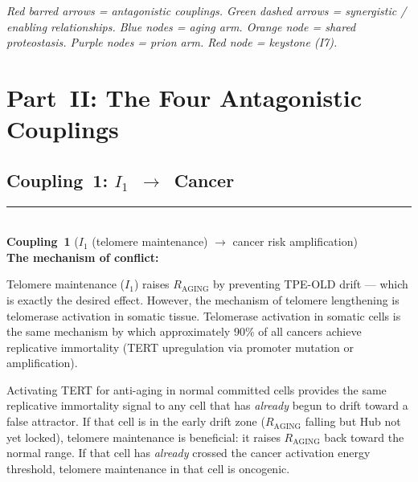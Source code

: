\documentclass[12pt,a4paper]{article}
\newcommand{\raging}{$R_{\mathrm{AGING}}$}
\newcommand{\tpeold}{TPE-OLD}
\newcommand{\Inet}[1]{$I_{#1}$}
\newcommand{\coupling}[2]{\medskip\noindent\rule{\linewidth}{0.4pt}\\
  \textbf{Coupling~#1} (#2)\\[0.3em]}
\begin{document}
\begin{center}
\end{center}

\vspace{0.5em}
\noindent\textit{Red barred arrows = antagonistic couplings. Green dashed
arrows = synergistic / enabling relationships. Blue nodes = aging arm.
Orange node = shared proteostasis. Purple nodes = prion arm.
Red node = keystone (I7).}

\section{Part~II: The Four Antagonistic Couplings}

\subsection{Coupling~1: \texorpdfstring{\Inet{1}~$\to$~Cancer}{I1 -> Cancer}}

\coupling{1}{\Inet{1} (telomere maintenance) $\to$ cancer risk amplification}

\textbf{The mechanism of conflict:}

Telomere maintenance (\Inet{1}) raises \raging{} by preventing \tpeold{}
drift --- which is exactly the desired effect. However, the mechanism of
telomere lengthening is telomerase activation in somatic tissue. Telomerase
activation in somatic cells is the same mechanism by which approximately 90\%
of all cancers achieve replicative immortality (TERT upregulation via promoter
mutation or amplification).

Activating TERT for anti-aging in normal committed cells provides the same
replicative immortality signal to any cell that has \textit{already} begun to
drift toward a false attractor. If that cell is in the early drift zone
(\raging{} falling but Hub not yet locked), telomere maintenance is
beneficial: it raises \raging{} back toward the normal range. If that cell has
\textit{already} crossed the cancer activation energy threshold, telomere
maintenance in that cell is oncogenic.
\end{document}

